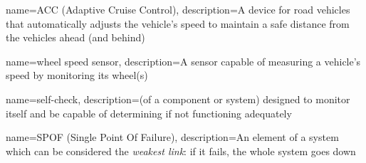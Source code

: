 {%
	name={ACC (Adaptive Cruise Control)},
	description={A device for road vehicles that automatically adjusts the
	vehicle's speed to maintain a safe distance from the vehicles ahead (and
	behind)}
}

{%
	name={wheel speed sensor},
	description={A sensor capable of measuring a vehicle's speed by
	monitoring its wheel(s)}
}

{%
	name={self-check},
	description={(of a component or system) designed to monitor itself and
	be capable of determining if not functioning adequately}
}

{%
	name={SPOF (Single Point Of Failure)},
	description={An element of a system which can be considered the
	\emph{weakest link}: if it fails, the whole system goes down}
}
